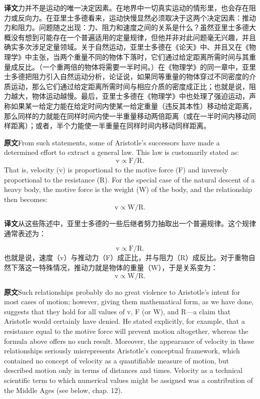 \documentclass[UTF8,zihao=-4]{ctexart}
\newcommand{\BodyFont}{\fontsize{10.5pt}{15.5pt}\selectfont}
\newcommand{\origlabel}{\textbf{原文}\quad}
\newcommand{\translabel}{\textbf{译文}\quad}
\newcommand{\orig}{\par\noindent\begingroup\BodyFont\origlabel}
\newcommand{\zhline}[1]{\par\endgroup\noindent\begingroup\BodyFont\translabel #1\par\endgroup\vspace{0.35em}}
\begin{document}
\zhline{力并不是运动的唯一决定因素。在地界中一切真实运动的情形里，也会存在阻力或反向力。在亚里士多德看来，运动快慢显然必须取决于这两个决定因素：推动力和阻力。问题随之出现：力、阻力和速度之间的关系是什么？虽然亚里士多德大概没有想到可能存在一个普遍适用的定量规律，但他并非对此问题毫无兴趣，并且确实多次涉足定量领域。关于自然运动，亚里士多德在《论天》中、并且又在《物理学》中主张，当两个重量不同的物体下落时，它们通过给定距离所需时间与其重量成反比。（一个重两倍的物体将需要一半时间。）在《物理学》的同一章中，亚里士多德把阻力引入自然运动分析，论证说，如果同等重量的物体穿过不同密度的介质运动，那么它们通过给定距离所需时间与相应介质的密度成正比；也就是说，阻力越大，物体运动越慢。最后，亚里士多德在《物理学》中也处理了强迫运动，声称如果某一给定力能在给定时间内使某一给定重量（违反其本性）移动给定距离，那么同样的力就能在同样时间内使一半重量移动两倍距离（或在一半时间内移动同样距离）；或者，半个力能使一半重量在同样时间内移动同样距离。}

\orig From such statements, some of Aristotle's successors have made a determined effort to extract a general law. This law is customarily stated as:
\[
\mathrm{v} \propto \mathrm{F}/\mathrm{R}.
\]
That is, velocity (v) is proportional to the motive force (F) and inversely proportional to the resistance (R). For the special case of the natural descent of a heavy body, the motive force is the weight (W) of the body, and the relationship then becomes:
\[
\mathrm{v} \propto \mathrm{W}/\mathrm{R}.
\]

\zhline{从这些陈述中，亚里士多德的一些后继者努力抽取出一个普遍规律。这个规律通常表述为：}
\[
\mathrm{v} \propto \mathrm{F}/\mathrm{R}.
\]
也就是说，速度（v）与推动力（F）成正比，并与阻力（R）成反比。对于重物自然下落这一特殊情况，推动力就是物体的重量（W），于是关系变为：
\[
\mathrm{v} \propto \mathrm{W}/\mathrm{R}.
\]

\orig Such relationships probably do no great violence to Aristotle's intent for most cases of motion; however, giving them mathematical form, as we have done, suggests that they hold for all values of v, F (or W), and R---a claim that Aristotle would certainly have denied. He stated explicitly, for example, that a resistance equal to the motive force will prevent motion altogether, whereas the formula above offers no such result. Moreover, the appearance of velocity in these relationships seriously misrepresents Aristotle's conceptual framework, which contained no concept of velocity as a quantifiable measure of motion, but described motion only in terms of distances and times. Velocity as a technical scientific term to which numerical values might be assigned was a contribution of the Middle Ages (see below, chap. 12).
\end{document}
